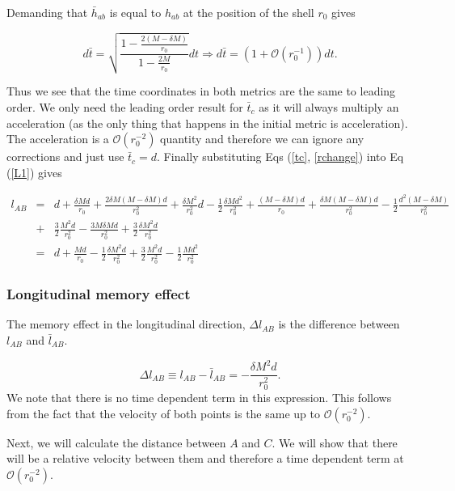 \documentclass[aps,showpacs,onecolumn,floats,prd,superscriptaddress,nofootinbib]{revtex4-1}
\begin{document}
Demanding that $\bar{h}_{ab}$ is equal to $h_{ab}$ at the position of the shell $r_0$ gives

\begin{equation}
	d\bar{t} = \sqrt{\frac{1 - \frac{2(M - \delta M)}{r_0}}{ 1- \frac{2M}{r_0}}} dt \Rightarrow d\bar{t} = \left( 1 + \mathcal{O}(r_0^{-1}) \right) dt.
\end{equation}

Thus we see that the time coordinates in both metrics are the same to leading order. We only need the leading order result for $\bar{t}_c$ as it will always multiply an acceleration (as the only thing that happens in the initial metric is acceleration). The acceleration is a $\mathcal{O}(r_0^{-2})$ quantity and therefore we can ignore any corrections and just use $\bar{t}_c = d$. 
Finally substituting Eqs (\ref{tc}, \ref{rchange}) into Eq (\ref{L1}) gives

\begin{eqnarray}
	l_{AB} & = & d + \frac{\delta M d}{r_0} + \frac{2\delta M(M - \delta M)d}{r_0^2} + \frac{\delta M^2}{r_0^2} d - \frac{1}{2} \frac{\delta M d^2}{r_0^2} + \frac{(M - \delta M)d}{r_0} + \frac{\delta M(M - \delta M) d}{r_0^2} - \frac{1}{2} \frac{d^2(M - \delta M)}{r_0^2} 	\nonumber	\\
	& + & \frac{3}{2} \frac{M^2 d}{r_0^2} - \frac{3 M \delta M d}{r_0^2} + \frac{3}{2} \frac{\delta M^2 d}{r_0^2}	\nonumber	\\
	& = & d + \frac{M d}{r_0} - \frac{1}{2} \frac{\delta M^2 d}{r_0^2} + \frac{3}{2} \frac{M^2 d}{r_0^2} -\frac{1}{2} \frac{Md^2}{r_0^2}	\label{lenfin}
\end{eqnarray}

\subsubsection{Longitudinal memory effect}

The memory effect in the longitudinal direction, $\Delta l_{AB}$ is the difference between $l_{AB}$ and $\bar{l}_{AB}$.

\begin{equation}
	\Delta l_{AB} \equiv l_{AB} - \bar{l}_{AB} = - \frac{\delta M^2 d}{r_0^2}.
\end{equation}
We note that there is no time dependent term in this expression. This follows from the fact that the velocity of both points is the same up to $\mathcal{O}(r_0^{-2})$.

Next, we will calculate the distance between $A$ and $C$. We will show that there will be a relative velocity between them and therefore a time dependent term at $\mathcal{O}(r_0^{-2})$. 
\end{document}
